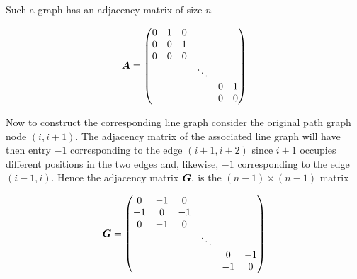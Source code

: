 \begin{figure}[H]
  \centering
  
\end{figure}

Such a graph has an adjacency matrix of size $n$

\begin{equation}
  \bm{A} =
  \begin{pmatrix}
    {0} & {1} & {0} & {}       & {}  & {}  \\
    {0} & {0} & {1} & {}       & {}  & {}  \\
    {0} & {0} & {0} & {}       & {}  & {}  \\
    {}  & {}  & {}  & {\ddots} & {}  & {}  \\
    {}  & {}  & {}  & {}       & {0} & {1} \\
    {}  & {}  & {}  & {}       & {0} & {0}
  \end{pmatrix}
\end{equation}

Now to construct the corresponding line graph consider the original path graph node $(i, i+1)$. The adjacency matrix of the associated line graph will have then entry $-1$ corresponding to the edge $(i+1, i+2)$ since $i+1$ occupies different positions in the two edges and, likewise, $-1$ corresponding to the edge $(i-1, i)$. Hence the adjacency matrix $\bm{G},$ is the $(n-1) \times (n-1)$ matrix

\begin{equation}
  \bm{G} =
  \begin{pmatrix}
    {0}  & {-1} & {0}  & {}       & {}   & {}   \\
    {-1} & {0}  & {-1} & {}       & {}   & {}   \\
    {0}  & {-1} & {0}  & {}       & {}   & {}   \\
    {}   & {}   & {}   & {\ddots} & {}   & {}   \\
    {}   & {}   & {}   & {}       & {0}  & {-1} \\
    {}   & {}   & {}   & {}       & {-1} & {0}
  \end{pmatrix}
\end{equation}

\begin{figure}[H]
  \centering
  
\end{figure}